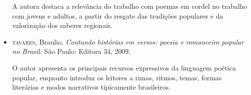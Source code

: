 \documentclass[12pt]{extarticle}
\begin{document}
\begin{itemize}
A autora destaca a relevância do trabalho com poemas em cordel no
trabalho com jovens e adultos, a partir do resgate das tradições
populares e da valorização dos saberes regionais.

\item\textsc{tavares}, Braulio. \textit{Contando histórias em versos: poesia e
  romanceiro popular no Brasil.} São Paulo: Editora 34, 2009.

O autor apresenta os principais recursos expressivos da linguagem
poética popular, enquanto introduz os leitores a rimas, ritmos, temas,
formas literárias e modos narrativos tipicamente brasileiros.
\end{itemize}
\end{document}
